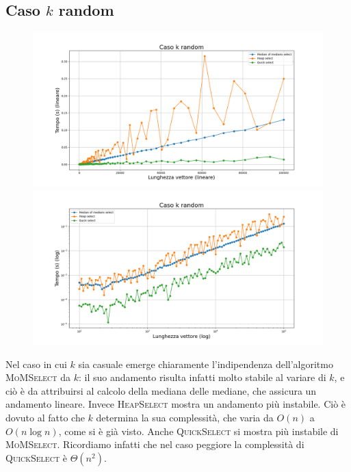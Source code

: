 \documentclass[a4paper,12pt]{article}
\newcommand{\QuickSelect}{\textsc{QuickSelect}}
\newcommand{\HeapSelect}{\textsc{HeapSelect}}
\newcommand{\MoMSelect}{\textsc{MoMSelect}}
\begin{document}
\subsection{Caso $k$ random}
\begin{figure}[h]
            \centering
            \includegraphics[width=.83\textwidth]{graphs/k_random_n.png}
            \includegraphics[width=.83\textwidth]{graphs/k_random_2xlog.png}
\end{figure}

Nel caso in cui $k$ sia casuale emerge chiaramente l'indipendenza dell'algoritmo \MoMSelect{} da $k$: il suo andamento risulta infatti molto stabile al variare di $k$, e ciò è da attribuirsi al calcolo della mediana delle mediane, che assicura un andamento lineare.
Invece \HeapSelect{} mostra un andamento più instabile.
Ciò è dovuto al fatto che $k$ determina la sua complessità, che varia da $O(n)$ a $O(n\log n)$, come si è già visto.
Anche \QuickSelect{} si mostra più instabile di \MoMSelect{}.
Ricordiamo infatti che nel caso peggiore la complessità di \QuickSelect{} è $\Theta(n^2)$.



\newpage
\end{document}
